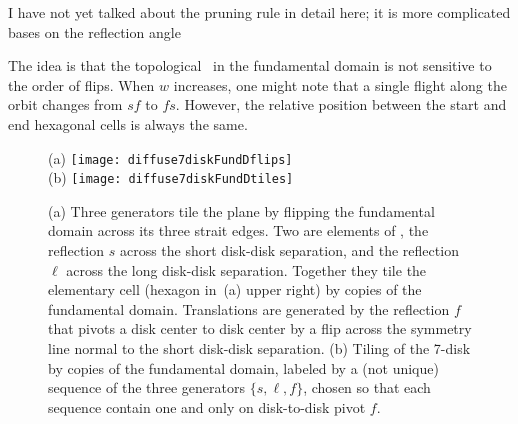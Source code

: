 


      {I have not yet talked about the pruning rule in
     detail here; it is more complicated bases on the reflection
     angle}

    {The idea is that the topological \po\ in the
    fundamental domain is not sensitive to the order of flips. When
    $w$ increases, one might note that a single flight along the
    orbit changes from $sf$ to $fs$. However, the relative position
    between the start and end hexagonal cells is always the same.}

\begin{figure}[htbp]
  \begin{center}
    (a) \texttt{[image: diffuse7diskFundDflips]}
    \\
    (b) \texttt{[image: diffuse7diskFundDtiles]}
  \end{center}
  \caption{\label{fig-7diskFundDflips}
  (a) Three generators tile the plane by flipping the fundamental
  domain across its three strait edges. Two are elements of ,
  the reflection  $s$ across the short disk-disk separation, and the
  reflection $\ell$ across the long disk-disk separation. Together
  they tile the elementary cell (hexagon in
  \,(a) upper right) by copies of the
  fundamental domain. Translations are generated by the reflection $f$
  that pivots a disk center to disk center by a flip across the
  symmetry line normal to the short disk-disk separation. (b) Tiling
  of the 7-disk by copies of the fundamental domain, labeled by a (not
  unique) sequence of the three generators  $\{s,\ell,f\}$, chosen so
  that each sequence contain one and only on  disk-to-disk pivot $f$.
  }
\end{figure}


